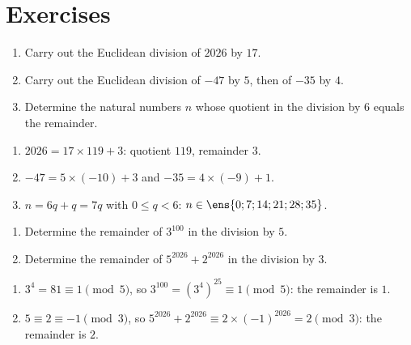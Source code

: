 \mxnewpage
\section{Exercises}
\begin{exercise}
\begin{enumerate}
\item Carry out the Euclidean division of $\num{2026}$ by $17$.
\item Carry out the Euclidean division of $-47$ by $5$, then of $-35$ by $4$.
\item Determine the natural numbers $n$ whose quotient in the division by $6$ equals the remainder.
\end{enumerate}
\end{exercise}
\begin{solution}
\begin{enumerate}
\item $\num{2026}=17\times119+3$: quotient $119$, remainder $3$.
\item $-47=5\times(-10)+3$ and $-35=4\times(-9)+1$.
\item $n=6q+q=7q$ with $0\le q<6$: $n\in\ens{0;7;14;21;28;35}$.
\end{enumerate}
\end{solution}

\begin{exercise}
\begin{enumerate}
\item Determine the remainder of $3^{100}$ in the division by $5$.
\item Determine the remainder of $5^{2026}+2^{2026}$ in the division by $3$.
\end{enumerate}
\end{exercise}
\begin{solution}
\begin{enumerate}
\item $3^4=81\equiv1\pmod5$, so $3^{100}=\left(3^4\right)^{25}\equiv1\pmod5$: the remainder is $1$.
\item $5\equiv2\equiv-1\pmod3$, so $5^{2026}+2^{2026}\equiv2\times(-1)^{2026}=2\pmod3$: the remainder is $2$.
\end{enumerate}
\end{solution}


